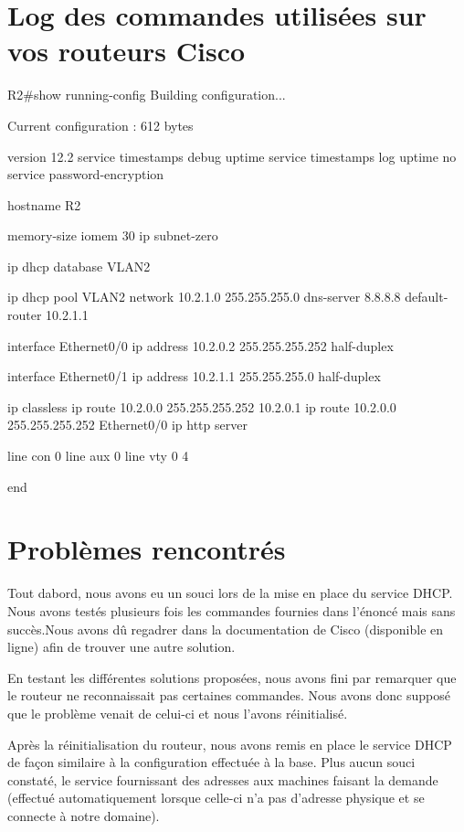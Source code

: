 \documentclass{article}
\begin{document}
\section{Log des commandes utilisées sur vos routeurs Cisco}

R2\#show running-config
Building configuration...

Current configuration : 612 bytes

version 12.2
service timestamps debug uptime
service timestamps log uptime
no service password-encryption

hostname R2

memory-size iomem 30
ip subnet-zero

ip dhcp database VLAN2

ip dhcp pool VLAN2
   network 10.2.1.0 255.255.255.0
   dns-server 8.8.8.8
   default-router 10.2.1.1

interface Ethernet0/0
 ip address 10.2.0.2 255.255.255.252
 half-duplex

interface Ethernet0/1
 ip address 10.2.1.1 255.255.255.0
 half-duplex

ip classless
ip route 10.2.0.0 255.255.255.252 10.2.0.1
ip route 10.2.0.0 255.255.255.252 Ethernet0/0
ip http server

line con 0
line aux 0
line vty 0 4

end

\section{Problèmes rencontrés}

Tout dabord, nous avons eu un souci lors de la mise en place du service DHCP. Nous avons testés
plusieurs fois les commandes fournies dans l'énoncé mais sans succès.Nous avons dû regadrer dans
la documentation de Cisco (disponible en ligne) afin de trouver une autre solution.

En testant les différentes solutions proposées, nous avons fini par remarquer que le routeur
ne reconnaissait pas certaines commandes. Nous avons donc supposé que le problème venait de celui-ci
et nous l'avons réinitialisé.

Après la réinitialisation du routeur, nous avons remis en place le service DHCP de façon similaire
à la configuration effectuée à la base. Plus aucun souci constaté, le service fournissant des adresses
aux machines faisant la demande (effectué automatiquement lorsque celle-ci n'a pas d'adresse physique et se connecte à notre domaine).
\end{document}
